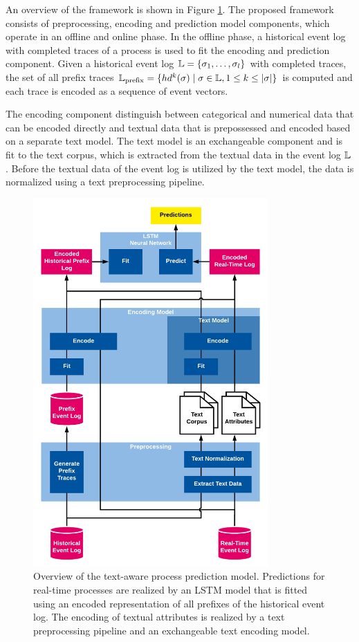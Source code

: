 An overview of the framework is shown in Figure \ref{fig:framework}.
The proposed framework consists of preprocessing, encoding and prediction model components, which operate in an offline and online phase.
In the offline phase, a historical event log with completed traces of a process is used to fit the encoding and prediction component.
Given a historical event log $\mathbb{L} = \{\sigma_1, \dots, \sigma_l\}$ with completed traces, the set of all prefix traces $\mathbb{L}_\mathrm{prefix} = \{ hd^k(\sigma) \mid  \sigma \in \mathbb{L}, 1 \leq k \leq |\sigma|\}$ is computed and each trace is encoded as a sequence of event vectors.

The encoding component distinguish between categorical and numerical data that can be encoded directly and textual data that is prepossessed and encoded based on a separate text model.
The text model is an exchangeable component and is fit to the text corpus, which is extracted from the textual data in the event log $\mathbb{L}$.
Before the textual data of the event log is utilized by the text model, the data is normalized using a text preprocessing pipeline.

\begin{figure}[!htbp]
	\centering
	\includegraphics[width=0.8\textwidth]{figures/framework}
	\caption[Overview of the text-aware process prediction model]{Overview of the text-aware process prediction model. Predictions for real-time processes are realized by an LSTM model that is fitted using an encoded representation of all prefixes of the historical event log. The encoding of textual attributes is realized by a text preprocessing pipeline and an exchangeable text encoding model.}
	\label{fig:framework}
\end{figure}

